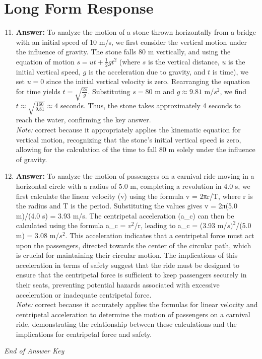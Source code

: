 \documentclass[12pt]{article}
\begin{document}
\section*{Long Form Response}
\begin{enumerate}[label=\arabic*.]
\setcounter{enumi}{10}
\item \textbf{Answer:} To analyze the motion of a stone thrown horizontally from a bridge with an initial speed of 10 m/s, we first consider the vertical motion under the influence of gravity. The stone falls 80 m vertically, and using the equation of motion \( s = ut + \frac{1}{2}gt^2 \) (where \( s \) is the vertical distance, \( u \) is the initial vertical speed, \( g \) is the acceleration due to gravity, and \( t \) is time), we set \( u = 0 \) since the initial vertical velocity is zero. Rearranging the equation for time yields \( t = \sqrt{\frac{2 s}{g}} \). Substituting \( s = 80 \) m and \( g \approx 9.81 \) m/$s^2$, we find \( t \approx \sqrt{\frac{160}{9.81}} \approx 4 \) seconds. Thus, the stone takes approximately 4 seconds to reach the water, confirming the key answer.
\\ \textit{Note:} correct because it appropriately applies the kinematic equation for vertical motion, recognizing that the stone's initial vertical speed is zero, allowing for the calculation of the time to fall 80 m solely under the influence of gravity.
\item \textbf{Answer:} To analyze the motion of passengers on a carnival ride moving in a horizontal circle with a radius of 5.0 m, completing a revolution in 4.0 s, we first calculate the linear velocity (v) using the formula v = 2πr/T, where r is the radius and T is the period. Substituting the values gives v = 2π(5.0 m)/(4.0 s) = 3.93 m/s. The centripetal acceleration (a\_c) can then be calculated using the formula a\_c = $v^2$/r, leading to a\_c = (3.93 m/$s)^2$/(5.0 m) = 3.08 m/$s^2$. This acceleration indicates that a centripetal force must act upon the passengers, directed towards the center of the circular path, which is crucial for maintaining their circular motion. The implications of this acceleration in terms of safety suggest that the ride must be designed to ensure that the centripetal force is sufficient to keep passengers securely in their seats, preventing potential hazards associated with excessive acceleration or inadequate centripetal force.
\\ \textit{Note:} correct because it accurately applies the formulas for linear velocity and centripetal acceleration to determine the motion of passengers on a carnival ride, demonstrating the relationship between these calculations and the implications for centripetal force and safety.
\end{enumerate}

\vfill
\noindent\textit{End of Answer Key}
\end{document}
